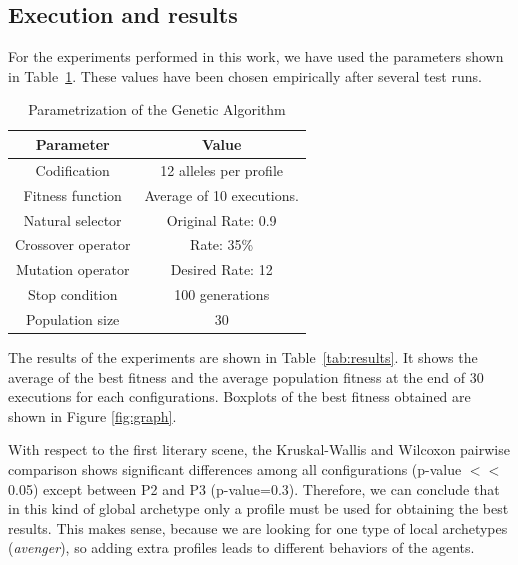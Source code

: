 \documentclass[letterpaper]{article}
\begin{document}
\subsection{Execution and results}

For the experiments performed in this work, we have used the parameters shown in Table~\ref{fig:ga_parameters}. These values have been chosen empirically after several test runs.


\begin{table}
\begin{center}

\begin{tabular}{|c|c|}%
\hline
Parameter & Value \\
\hline\hline
Codification & 12 alleles per profile\\
Fitness function & Average of 10 executions.\\
Natural selector & Original Rate: 0.9 \\
Crossover operator & Rate: 35\% \\
Mutation operator & Desired Rate: 12 \\
Stop condition & 100 generations\\
Population size & 30 \\
\hline
\end{tabular}


\end{center}
\vskip 0.25cm
\caption{Parametrization of the Genetic Algorithm}
\label{fig:ga_parameters}
\end{table}







The results of the experiments are shown in
Table~\ref{tab:results}. It shows the average of the best fitness
and the average population fitness at the end of 30 executions for
each configurations. Boxplots of the best fitness obtained are shown
in Figure \ref{fig:graph}. 

With respect to the first literary scene, the Kruskal-Wallis and Wilcoxon
pairwise comparison shows significant differences among all
configurations (p-value $<<$ 0.05) except between P2 and P3
(p-value=0.3). Therefore, we can conclude that in this kind of global
archetype only a profile must be used for obtaining the best
results. This makes sense, because we are looking for one type of
local archetypes ({\em avenger}), so adding extra profiles leads to
different behaviors of the agents. 
\end{document}

